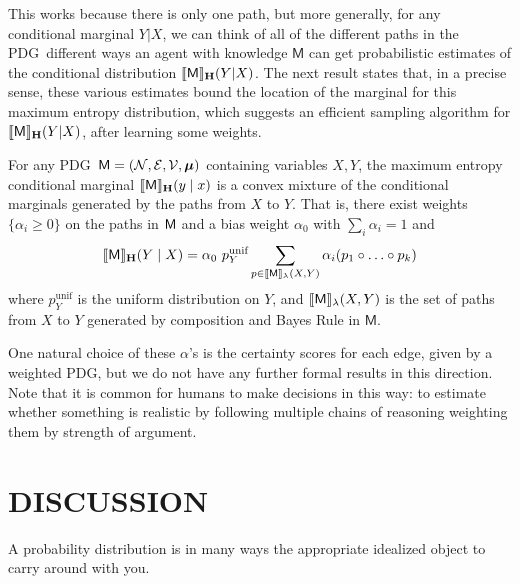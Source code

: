 \documentclass{article}
\newcommand\MaxEnt{_{\mathbf H}}
\newcommand{\sfM}{\mathsf M}
\newcommand{\MN}{PDG}
\numberwithin{equation}{section}
\begin{document}
	This works because there is only one path, but more generally, for any conditional marginal $Y|X$, we can think of all of the different paths in the \MN\ different ways an agent with knowledge $\sfM$ can get probabilistic estimates of the conditional distribution $\bbr{\sfM}\MaxEnt(Y | X)$. The next result states that, in a precise sense, these various estimates bound the location of the marginal for this maximum entropy distribution, which suggests an efficient sampling algorithm for $\bbr{\sfM}\MaxEnt(Y | X)$, after learning some weights.
	
	\begin{conj}\label{thm:maxent-hull}
		For any \MN\ $\sfM = \mnvars[]$ containing variables $X, Y$, the maximum entropy conditional marginal $\bbr{\sfM}\MaxEnt(y \mid x)$ is a convex mixture of the conditional marginals generated by the paths from $X$ to $Y$.  That is, there exist weights $\{\alpha_i \geq 0\}$ on the paths in $\sf M$ and a bias weight $\alpha_0$ with $\sum_i {\alpha_i} = 1$ and
		\[ \bbr{\sfM}\MaxEnt(Y \mid X) = \alpha_0 \  p^{\text{unif}}_Y \sum_{p \in \bbr{\sfM}_\lambda(X, Y)} \alpha_i (p_1 \circ \ldots \circ p_k) \]
		where $p^{\text{unif}}_Y$ is the uniform distribution on $Y$, and $\bbr{\sfM}_\lambda(X,Y)$ is the set of paths from $X$ to $Y$ generated by composition and Bayes Rule in $\sfM$. 
	\end{conj}

	One natural choice of these $\alpha$'s is the certainty scores for each edge, given by a weighted \MN, but we do not have any further formal results in this direction.
	Note that it is common for humans to make decisions in this way: to estimate whether something is realistic by following multiple chains of reasoning weighting them by strength of argument.
	
	





	\section{DISCUSSION}
	
	
	A probability distribution is in many ways the appropriate idealized object to carry around with you.
	
\end{document}
